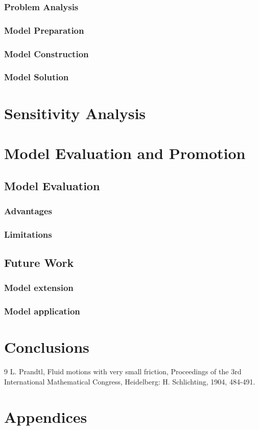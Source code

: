 \documentclass{mcmthesis}
\begin{document}
\subsubsection{Problem Analysis}
\subsubsection{Model Preparation}
\subsubsection{Model Construction}
\subsubsection{Model Solution}
\section{Sensitivity Analysis}
\section{Model Evaluation and Promotion}
\subsection{Model Evaluation}
\subsubsection{Advantages}
\subsubsection{Limitations}
\subsection{Future Work}
\subsubsection{Model extension}
\subsubsection{Model application}
\section{Conclusions}

\begin{thebibliography}{9}%
 L. Prandtl, Fluid motions with very small friction, Proceedings of the 3rd International Mathematical Congress, Heidelberg: H. Schlichting, 1904, 484-491.

\end{thebibliography}
\section*{Appendices}
\end{document}

